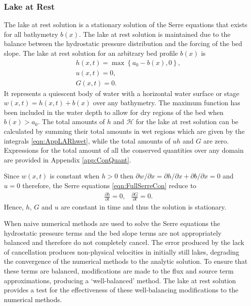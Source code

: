 \subsubsection{Lake at Rest}
The lake at rest solution is a stationary solution of the Serre equations that exists for all bathymetry $b(x)$. The lake at rest solution is maintained due to the balance between the hydrostatic pressure distribution and the forcing of the bed slope. The lake at rest solution for an arbitrary bed profile $b(x)$ is
\begin{subequations}
	\begin{align}
	&h(x,t) = \max\left\lbrace a_0 - b(x), 0 \right\rbrace, \\
	&u(x,t) = 0 , \\
	&G(x,t) = 0 .
	\end{align}
	\label{eqn:LARdefhub}
\end{subequations}
It represents a quiescent body of water with a horizontal water surface or stage $w(x,t) = h(x,t) + b(x)$ over any bathymetry. The maximum function has been included in the water depth to allow for dry regions of the bed when $b(x) > a_0$. The total amounts of $h$ and $\mathcal{H}$ for the lake at rest solution can be calculated by summing their total amounts in wet regions which are given by the integrals \eqref{eqn:AppLARhwet}, while the total amounts of $uh$ and $G$ are zero. Expressions for the total amount of all the conserved quantities over any domain are provided in Appendix \ref{app:ConQuant}. 

Since $w(x,t)$ is constant when $h> 0$ then $\partial w / \partial x = \partial h / \partial x + \partial b / \partial x = 0 $ and $u=0$ therefore, the Serre equations \eqref{eqn:FullSerreCon} reduce to
\begin{align*}
& \frac{\partial h}{\partial t}  = 0,  &\frac{\partial G}{\partial t}  = 0.
\end{align*}
Hence, $h$, $G$ and $u$ are constant in time and thus the solution is stationary.

When naive numerical methods are used to solve the Serre equations the hydrostatic pressure terms and the bed slope terms are not appropriately balanced and therefore do not completely cancel. The error produced by the lack of cancellation produces non-physical velocities in initially still lakes, degrading the convergence of the numerical methods to the analytic solution. To ensure that these terms are balanced, modifications are made to the flux and source term approximations, producing a `well-balanced' method. The lake at rest solution provides a test for the effectiveness of these well-balancing modifications to the numerical methods.


